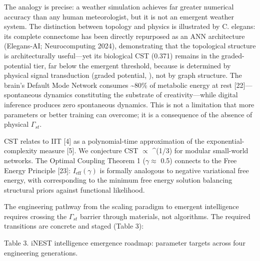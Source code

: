 \documentclass[a4paper,12pt]{article}
\begin{document}
The analogy is precise: a weather simulation achieves far greater numerical accuracy than any human meteorologist, but it is not an emergent weather system.
The distinction between topology and physics is illustrated by C. elegans: its complete connectome has been directly repurposed as an ANN architecture (Elegans-AI; Neurocomputing 2024), demonstrating that the topological structure is architecturally useful---yet its biological CST (0.371) remains in the graded-potential tier, far below the emergent threshold, because  \alpha  is determined by physical signal transduction (graded potential,  \alpha   {}), not by graph structure.
The brain's Default Mode Network consumes \textasciitilde{}80\% of metabolic energy at rest [22]---spontaneous dynamics constituting the substrate of creativity---while digital inference produces zero spontaneous dynamics.
This is not a limitation that more parameters or better training can overcome; it is a consequence of the absence of physical $\Gamma_{st}$.

CST relates to IIT [4] as a polynomial-time approximation of the exponential-complexity  \Phi  measure [5]. We conjecture CST $\propto$  \Phi ^(1/3) for modular small-world networks. The Optimal Coupling Theorem 1 ($\gamma \approx$ 0.5) connects to the Free Energy Principle [23]: $I_{\text{eff}}(\gamma)$ is formally analogous to negative variational free energy, with  \gamma  corresponding to the minimum free energy solution balancing structural priors against functional likelihood.

The engineering pathway from the scaling paradigm to emergent intelligence requires crossing the $\Gamma_{st}$ barrier through materials, not algorithms. The required transitions are concrete and staged (Table 3):

Table 3. iNEST intelligence emergence roadmap: parameter targets across four engineering generations.
\end{document}
